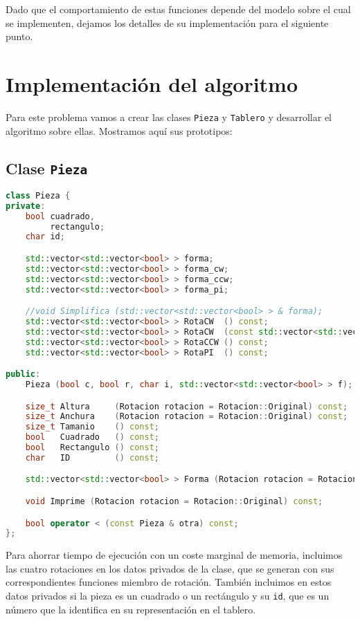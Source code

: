 Dado que el comportamiento de estas funciones depende del modelo sobre el cual se implementen, dejamos los detalles de su implementación para el siguiente punto.

\section{Implementación del algoritmo}\label{grafos-implementacion}

Para este problema vamos a crear las clases \texttt{Pieza} y \texttt{Tablero} y desarrollar el algoritmo sobre ellas.
Mostramos aquí sus prototipos:

\subsection{Clase \texttt{Pieza}}\label{grafos-implementacion-pieza}

\begin{lstlisting}[language=C++]
class Pieza {
private:
	bool cuadrado,
	     rectangulo;
	char id;

	std::vector<std::vector<bool> > forma;
	std::vector<std::vector<bool> > forma_cw;
	std::vector<std::vector<bool> > forma_ccw;
	std::vector<std::vector<bool> > forma_pi;

	//void Simplifica (std::vector<std::vector<bool> > & forma);
	std::vector<std::vector<bool> > RotaCW  () const;
	std::vector<std::vector<bool> > RotaCW  (const std::vector<std::vector<bool> > & rotable) const;
	std::vector<std::vector<bool> > RotaCCW () const;
	std::vector<std::vector<bool> > RotaPI  () const;

public:
	Pieza (bool c, bool r, char i, std::vector<std::vector<bool> > f);

	size_t Altura     (Rotacion rotacion = Rotacion::Original) const;
	size_t Anchura    (Rotacion rotacion = Rotacion::Original) const;
	size_t Tamanio    () const;
	bool   Cuadrado   () const;
	bool   Rectangulo () const;
	char   ID         () const;

	std::vector<std::vector<bool> > Forma (Rotacion rotacion = Rotacion::Original) const;

	void Imprime (Rotacion rotacion = Rotacion::Original) const;

	bool operator < (const Pieza & otra) const;
};
\end{lstlisting}

Para ahorrar tiempo de ejecución con un coste marginal de memoria, incluimos las cuatro rotaciones en los datos privados de la clase, que se generan con sus correspondientes funciones miembro de rotación.
También incluimos en estos datos privados si la pieza es un cuadrado o un rectángulo y su \texttt{id}, que es un número que la identifica en su representación en el tablero.

